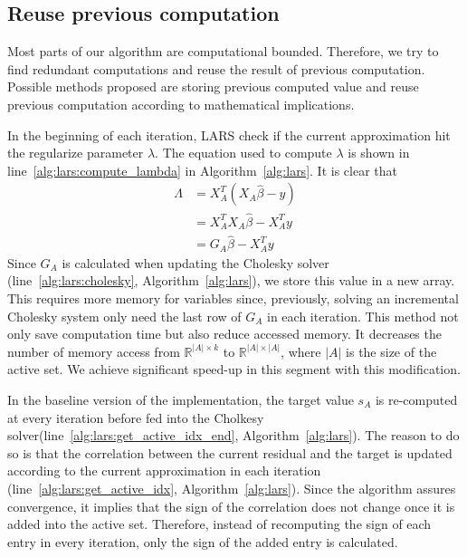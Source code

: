 \subsection{Reuse previous computation}
Most parts of our algorithm are computational bounded. Therefore, we try to find redundant computations and reuse the result of previous computation.
Possible methods proposed are storing previous computed value and reuse previous computation according to mathematical implications.

In the beginning of each iteration, LARS check if the current approximation hit the regularize parameter $\lambda$. The equation used to compute $\lambda$ is shown in line~\ref{alg:lars:compute_lambda} in Algorithm~\ref{alg:lars}.
It is clear that 
\begin{equation}
    \begin{split}
        \Lambda &= X_A^T ( X_A \hat{\beta} - y) \\
                &= X_A^T X_A \hat{\beta} - X_A^T y \\
                &= G_A \hat{\beta} - X_A^T y
    \end{split}
\end{equation}
Since $G_A$ is calculated when updating the Cholesky solver (line~\ref{alg:lars:cholesky}, Algorithm~\ref{alg:lars}), we store this value in a new array. This requires more memory for variables since, previously, solving an incremental Cholesky system only need the last row of $G_A$ in each iteration.
This method not only save computation time but also reduce accessed memory.
It decreases the number of memory access from $\mathbb{R}^{|A| \times k}$ to $\mathbb{R}^{|A| \times |A|}$, where $|A|$ is the size of the active set.
We achieve significant speed-up in this segment with this modification.

In the baseline version of the implementation,
the target value $s_A$ is re-computed at every iteration before fed into the Cholkesy solver(line~\ref{alg:lars:get_active_idx_end}, Algorithm~\ref{alg:lars}).
The reason to do so is that the correlation between the current residual and the target is updated according to the current approximation in each iteration (line~\ref{alg:lars:get_active_idx}, Algorithm~\ref{alg:lars}).
Since the algorithm assures convergence, it implies that the sign of the correlation does not change once it is added into the active set.
Therefore, instead of recomputing the sign of each entry in every iteration, only the sign of the  added entry is calculated.

